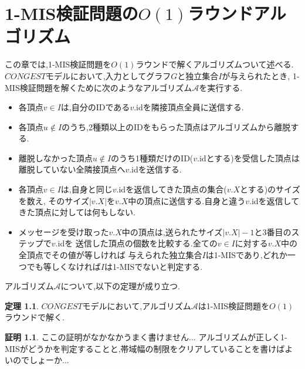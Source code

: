 \documentclass[12pt]{thesis}
\theoremstyle{definition}
\newtheorem{theorem}{定理}[chapter]
\newtheorem*{prf*}{証明}
\begin{document}
\newpage

\chapter{1-MIS検証問題の$O(1)$ラウンドアルゴリズム}
この章では,1-MIS検証問題を$O(1)$ラウンドで解くアルゴリズムついて述べる. \\
$CONGEST$モデルにおいて,入力としてグラフ$G$と独立集合$I$が与えられたとき,
1-MIS検証問題を解くために次のようなアルゴリズム$\mathcal{A}$を実行する.
\begin{itemize}
\item 各頂点$v \in I$は,自分のIDである$v$.idを隣接頂点全員に送信する.
\item 各頂点$u \notin I$のうち,2種類以上のIDをもらった頂点はアルゴリズムから離脱する.
\item 離脱しなかった頂点$u \notin I$のうち1種類だけのID($v$.idとする)を受信した頂点は
離脱していない全隣接頂点へ$v$.idを送信する.
\item 各頂点$v \in I$は,自身と同じ$v$.idを返信してきた頂点の集合($v.X$とする)のサイズを数え,
そのサイズ$|v.X|$を$v.X$中の頂点に送信する.自身と違う$v$.idを返信してきた頂点に対しては何もしない.
\item メッセージを受け取った$v.X$中の頂点は,送られたサイズ$|v.X| - 1$と3番目のステップで$v$.idを
送信した頂点の個数を比較する.全ての$v \in I$に対する$v.X$中の全頂点でその値が等しければ
与えられた独立集合$I$は1-MISであり,どれか一つでも等しくなければ$I$は1-MISでないと判定する.
\end{itemize}
アルゴリズム$\mathcal{A}$について,以下の定理が成り立つ.
\begin{theorem}
$CONGEST$モデルにおいて,アルゴリズム$\mathcal{A}$は1-MIS検証問題を$O(1)$ラウンドで解く.
\end{theorem}
\begin{prf*}
ここの証明がなかなかうまく書けません...
アルゴリズムが正しく1-MISがどうかを判定することと,帯域幅の制限をクリアしていることを書けばよいのでしょーか...
\end{prf*}
\newpage
\end{document}
